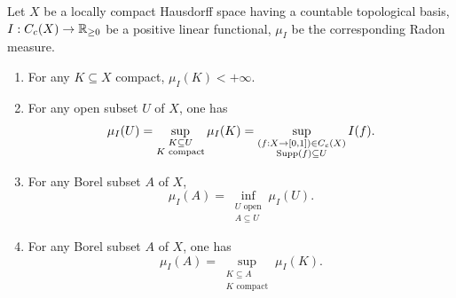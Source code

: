 \begin{propositionenv}\label{prop:5.4.4}
    Let $X$ be a locally compact Hausdorff space having a countable topological basis,
    $I : C_{c} (X) \rightarrow \mathbb{R}_{\ge 0}$ be a positive linear functional,
    $\mu_{I}$ be the corresponding Radon measure.
    \begin{enumerate}[label=(\arabic*)]
        \item For any $K \subseteq X$ compact, $\mu_I(K) < +\infty$.
        \item For any open subset $U$ of $X$, one has
        $$\mu_{I} (U) = \sup_{\substack{K \subseteq U\\K \text{ compact}}} \mu_{I}(K) = \sup_{\substack{(f : X \rightarrow [0,1]) \in C_c(X)\\ \operatorname{\mathrm{Supp}}(f) \subseteq U}} I(f).$$
        \item For any Borel subset $A$ of $X$,
        $$\mu_{I} (A) = \inf_{\substack{U \text{ open}\\ A \subseteq U}} \mu_{I} (U).$$
        \item For any Borel subset $A$ of $X$, one has 
        $$\mu_{I}(A) = \sup_{\substack{K \subseteq A\\K \text{ compact}}} \mu_{I}(K).$$
    \end{enumerate}
\end{propositionenv}
